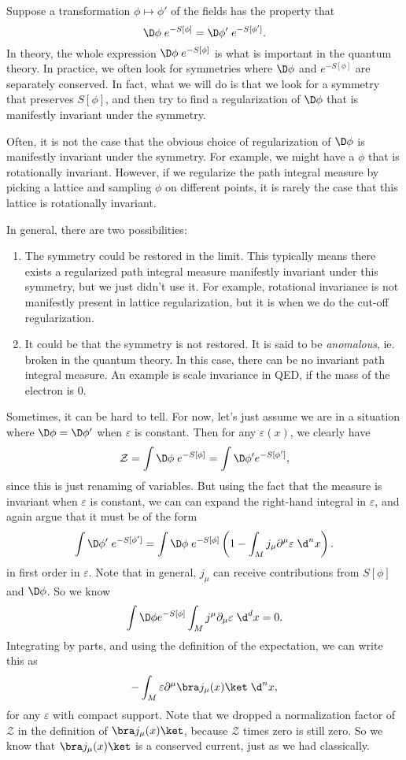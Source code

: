 \documentclass[a4paper]{article}
\begin{document}
Suppose a transformation $\phi \mapsto \phi'$ of the fields has the property that
\[
  \D \phi\; e^{-S[\phi]} = \D \phi'\; e^{-S[\phi']}.
\]
In theory, the whole expression $\D \phi\; e^{-S[\phi]}$ is what is important in the quantum theory. In practice, we often look for symmetries where $\D \phi$ and $e^{-S[\phi]}$ are separately conserved. In fact, what we will do is that we look for a symmetry that preserves $S[\phi]$, and then try to find a regularization of $\D \phi$ that is manifestly invariant under the symmetry.

Often, it is not the case that the obvious choice of regularization of $\D \phi$ is manifestly invariant under the symmetry. For example, we might have a $\phi$ that is rotationally invariant. However, if we regularize the path integral measure by picking a lattice and sampling $\phi$ on different points, it is rarely the case that this lattice is rotationally invariant.

In general, there are two possibilities:
\begin{enumerate}
  \item The symmetry could be restored in the limit. This typically means there exists a regularized path integral measure manifestly invariant under this symmetry, but we just didn't use it. For example, rotational invariance is not manifestly present in lattice regularization, but it is when we do the cut-off regularization.
  \item It could be that the symmetry is not restored. It is said to be \emph{anomalous}, ie. broken in the quantum theory. In this case, there can be no invariant path integral measure. An example is scale invariance in QED, if the mass of the electron is $0$.
\end{enumerate}
Sometimes, it can be hard to tell. For now, let's just assume we are in a situation where $\D \phi = \D \phi'$ when $\varepsilon$ is constant. Then for any $\varepsilon(x)$, we clearly have
\[
  \mathcal{Z} = \int \D \phi\; e^{-S [\phi]} = \int \D \phi' e^{-S[\phi']},
\]
since this is just renaming of variables. But using the fact that the measure is invariant when $\varepsilon$ is constant, we can can expand the right-hand integral in $\varepsilon$, and again argue that it must be of the form
\[
  \int \D \phi'\; e^{-S[\phi']} = \int \D \phi\; e^{-S[\phi]} \left(1 - \int_M j_\mu \partial^\mu \varepsilon\; \d^n x\right).
\]
in first order in $\varepsilon$. Note that in general, $j_\mu$ can receive contributions from $S[\phi]$ and $\D \phi$. So we know
\[
  \int \D \phi e^{-S[\phi]} \int_M j^\mu \partial_\mu \varepsilon \;\d^d x = 0.
\]
Integrating by parts, and using the definition of the expectation, we can write this as
\[
  -\int_M \varepsilon \partial^\mu \bra j_\mu (x)\ket\; \d^n x,
\]
for any $\varepsilon$ with compact support. Note that we dropped a normalization factor of $\mathcal{Z}$ in the definition of $\bra j_\mu(x)\ket$, because $\mathcal{Z}$ times zero is still zero. So we know that $\bra j_\mu (x)\ket$ is a conserved current, just as we had classically.
\end{document}
